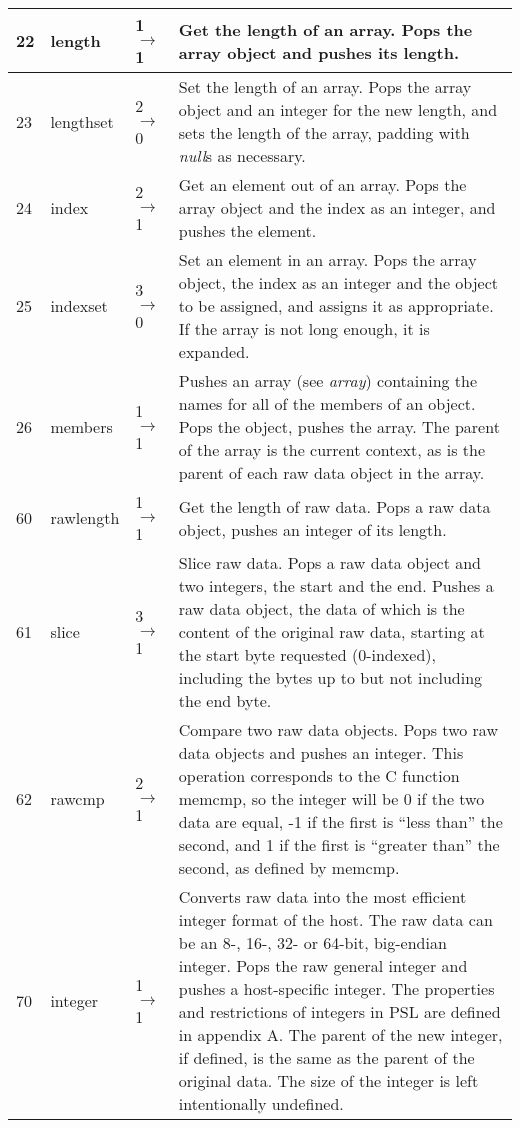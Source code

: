 \begin{longtable}{ | l | l | l | X | }
\hline
22 & length & 1 $\rightarrow$ 1 & Get the length of an array. Pops the array object and pushes its length. \\
\hline
23 & lengthset & 2 $\rightarrow$ 0 & Set the length of an array. Pops the array object and an integer for the new length, and sets the length of the array, padding with \textit{null}s as necessary. \\
\hline
24 & index & 2 $\rightarrow$ 1 & Get an element out of an array. Pops the array object and the index as an integer, and pushes the element. \\
\hline
25 & indexset & 3 $\rightarrow$ 0 & Set an element in an array. Pops the array object, the index as an integer and the object to be assigned, and assigns it as appropriate. If the array is not long enough, it is expanded. \\
\hline
26 & members & 1 $\rightarrow$ 1 & Pushes an array (see \textit{array}) containing the names for all of the members of an object. Pops the object, pushes the array. The parent of the array is the current context, as is the parent of each raw data object in the array. \\
\hline
60 & rawlength & 1 $\rightarrow$ 1 & Get the length of raw data. Pops a raw data object, pushes an integer of its length. \\
\hline
61 & slice & 3 $\rightarrow$ 1 & Slice raw data. Pops a raw data object and two integers, the start and the end. Pushes a raw data object, the data of which is the content of the original raw data, starting at the start byte requested (0-indexed), including the bytes up to but not including the end byte. \\
\hline
62 & rawcmp & 2 $\rightarrow$ 1 & Compare two raw data objects. Pops two raw data objects and pushes an integer. This operation corresponds to the C function memcmp, so the integer will be 0 if the two data are equal, -1 if the first is “less than” the second, and 1 if the first is “greater than” the second, as defined by memcmp. \\
\hline
70 & integer & 1 $\rightarrow$ 1 & Converts raw data into the most efficient integer format of the host. The raw data can be an 8-, 16-, 32- or 64-bit, big-endian integer. Pops the raw general integer and pushes a host-specific integer. The properties and restrictions of integers in PSL are defined in appendix A. The parent of the new integer, if defined, is the same as the parent of the original data. The size of the integer is left intentionally undefined. \\

\end{longtable}
